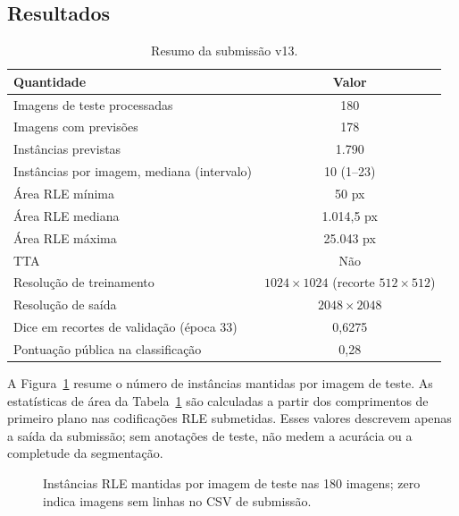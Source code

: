 \documentclass[
  article,
  11pt,
  oneside,
  a4paper,
  english,
  brazil,
  sumario=tradicional
]{abntex2}
\begin{document}
\subsection{Resultados}

\begin{table}[htbp]
\centering
\caption{Resumo da submissão v13.}
\label{tab:results}
\begin{tabular}{lc}
\toprule
Quantidade & Valor \\
\midrule
Imagens de teste processadas & 180 \\
Imagens com previsões & 178 \\
Instâncias previstas & 1.790 \\
Instâncias por imagem, mediana (intervalo) & 10 (1--23) \\
Área RLE mínima & 50 px \\
Área RLE mediana & 1.014,5 px \\
Área RLE máxima & 25.043 px \\
TTA & Não \\
Resolução de treinamento & $1024\times1024$ (recorte $512\times512$) \\
Resolução de saída & $2048\times2048$ \\
Dice em recortes de validação (época 33) & 0,6275 \\
Pontuação pública na classificação & 0,28 \\
\bottomrule
\end{tabular}
\par{}
\end{table}

A Figura~\ref{fig:instance-counts} resume o número de instâncias mantidas por imagem de teste. As estatísticas de área da Tabela~\ref{tab:results} são calculadas a partir dos comprimentos de primeiro plano nas codificações RLE submetidas. Esses valores descrevem apenas a saída da submissão; sem anotações de teste, não medem a acurácia ou a completude da segmentação.

\begin{figure}[htbp]
\centering
{}
\caption{Instâncias RLE mantidas por imagem de teste nas 180 imagens; zero indica imagens sem linhas no CSV de submissão.}
\label{fig:instance-counts}
\par{}
\end{figure}
\end{document}
